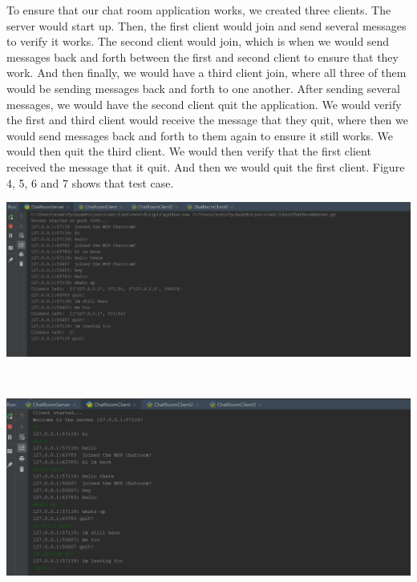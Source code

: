 \documentclass[12pt]{report}
\begin{document}
\noindent
To ensure that our chat room application works, we created three clients. The server would start up. Then, the first client would join and send several messages to verify it works. The second client would join, which is when we would send messages back and forth between the first and second client to ensure that they work. And then finally, we would have a third client join, where all three of them would be sending messages back and forth to one another. After sending several messages, we would have the second client quit the application. We would verify the first and third client would receive the message that they quit, where then we would send messages back and forth to them again to ensure it still works. We would then quit the third client. We would then verify that the first client received the message that it quit. And then we would quit the first client. Figure 4, 5, 6 and 7 shows that test case.

\begin{center}
\includegraphics[scale=.2]{chatroom-app-00.png}\\
\end{center} \\

\begin{center}
\includegraphics[scale=.2]{chatroom-app-01.png}\\
\end{center} \\
\end{document}
